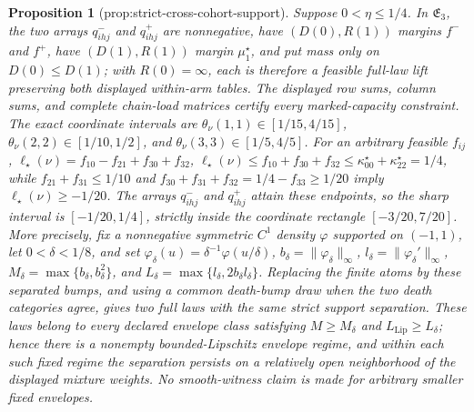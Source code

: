 \documentclass{article}
\newtheorem{proposition}{Proposition}
\begin{document}
\begin{proposition}[prop:strict-cross-cohort-support]\label{prop:strict-cross-cohort-support}
Suppose \(0<\eta\leq1/4\).  In \(\mathfrak E_3\), the two arrays \(q^-_{ihj}\) and \(q^+_{ihj}\) are nonnegative, have \((D(0),R(1))\) margins \(f^-\) and \(f^+\), have \((D(1),R(1))\) margin \(\mu_1^\star\), and put mass only on \(D(0)\leq D(1)\); with \(R(0)=\infty\), each is therefore a feasible full-law lift preserving both displayed within-arm tables.  The displayed row sums, column sums, and complete chain-load matrices certify every marked-capacity constraint.  The exact coordinate intervals are \(\theta_\nu(1,1)\in[1/15,4/15]\), \(\theta_\nu(2,2)\in[1/10,1/2]\), and \(\theta_\nu(3,3)\in[1/5,4/5]\).  For an arbitrary feasible \(f_{ij}\), \(\ell_\star(\nu)=f_{10}-f_{21}+f_{30}+f_{32}\), \(\ell_\star(\nu)\leq f_{10}+f_{30}+f_{32}\leq\kappa^\star_{00}+\kappa^\star_{22}=1/4\), while \(f_{21}+f_{31}\leq1/10\) and \(f_{30}+f_{31}+f_{32}=1/4-f_{33}\geq1/20\) imply \(\ell_\star(\nu)\geq-1/20\).  The arrays \(q^-_{ihj}\) and \(q^+_{ihj}\) attain these endpoints, so the sharp interval is \([-1/20,1/4]\), strictly inside the coordinate rectangle \([-3/20,7/20]\).  More precisely, fix a nonnegative symmetric \(C^1\) density \(\varphi\) supported on \((-1,1)\), let \(0<\delta<1/8\), and set \(\varphi_\delta(u)=\delta^{-1}\varphi(u/\delta)\), \(b_\delta=\|\varphi_\delta\|_\infty\), \(l_\delta=\|\varphi_\delta'\|_\infty\), \(M_\delta=\max\{b_\delta,b_\delta^2\}\), and \(L_\delta=\max\{l_\delta,2b_\delta l_\delta\}\).  Replacing the finite atoms by these separated bumps, and using a common death-bump draw when the two death categories agree, gives two full laws with the same strict support separation.  These laws belong to every declared envelope class satisfying \(M\geq M_\delta\) and \(L_{\mathrm{Lip}}\geq L_\delta\); hence there is a nonempty bounded-Lipschitz envelope regime, and within each such fixed regime the separation persists on a relatively open neighborhood of the displayed mixture weights.  No smooth-witness claim is made for arbitrary smaller fixed envelopes.
\end{proposition}
\end{document}
